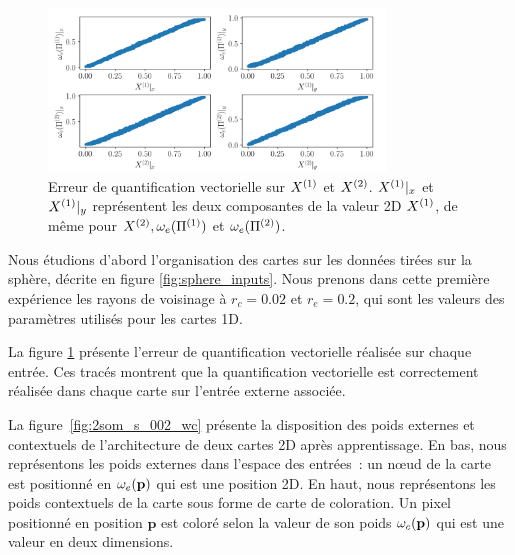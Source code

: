 \documentclass[../main]{subfiles}
\begin{document}
\begin{figure}[h]
	\centering\includegraphics[width=0.8\textwidth]{error-2SOM.png}
	\caption{Erreur de quantification vectorielle sur $X^{({1})}$ et $X^{({2})}$. $X^{({1})}|_x$ et $X^{({1})}|_y$ représentent les deux composantes de la valeur 2D $X^{({1})}$, de même pour $X^{({2})}, \omega_e(\Pi^{({1})})$ et  $\omega_e(\Pi^{({2})})$. \label{fig:err_2D}}
\end{figure}

Nous étudions d'abord l'organisation des cartes sur les données tirées sur la sphère, décrite en figure \ref{fig:sphere_inputs}. 
Nous prenons dans cette première expérience les rayons de voisinage à $r_c = 0.02$ et $r_e = 0.2$, qui sont les valeurs des paramètres utilisés pour les cartes 1D.

La figure \ref{fig:err_2D} présente l'erreur de quantification vectorielle réalisée sur chaque entrée. Ces tracés montrent que la quantification vectorielle est correctement réalisée dans chaque carte sur l'entrée externe associée.

La figure~\ref{fig:2som_s_002_wc} présente la disposition des poids externes et contextuels de l'architecture de deux cartes 2D après apprentissage.
En bas, nous représentons les poids externes dans l'espace des entrées~: un n\oe{}ud de la carte est positionné en $\omega_e(\mathbf{p})$ qui est une position 2D.
En haut, nous représentons les poids contextuels de la carte sous forme de carte de coloration. Un pixel positionné en position $\mathbf{p}$ est coloré selon la valeur de son poids $\omega_c(\mathbf{p})$ qui est une valeur en deux dimensions.
\end{document}
